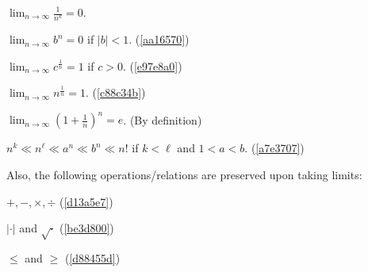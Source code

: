 \begin{enumerati}
  \def\limn{\displaystyle\lim_{n\to\infty}}
  \item $\limn\frac1{n^k}=0$.
  \item $\limn b^n=0$ if $|b|<1$. (\autoref{aa16570})
  \item $\limn c^\frac1n=1$ if $c>0$. (\autoref{e97e8a0})
  \item $\limn n^\frac1n=1$. (\autoref{c88c34b})
  \item $\limn\left(1+\frac1n\right)^n=e$. (By definition)
  \item $n^k\ll n^\ell\ll a^n\ll b^n\ll n!$ if $k<\ell$ and $1<a<b$. (\autoref{a7e3707})
\end{enumerati}

Also, the following operations/relations are preserved upon taking limits:
\begin{enumerati}
  \item $+,-,\times,\div$ (\autoref{d13a5e7})
  \item $|\cdot|$ and $\sqrt\cdot$ (\autoref{be3d800})
  \item $\leq$ and $\geq$ (\autoref{d88455d})
\end{enumerati}
